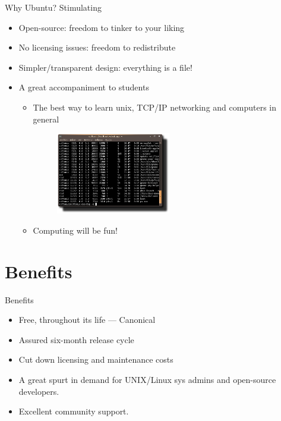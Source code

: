 \documentclass{beamer}
\begin{document}
 \begin{frame}{Why Ubuntu?}
  Stimulating
  \begin{itemize}
   \pause
   \item Open-source: freedom to tinker to your liking
   \pause
   \item No licensing issues: freedom to redistribute
   \pause
   \item Simpler/transparent design: everything is a file!
  \end{itemize}
 \end{frame}

 \begin{frame}
  \begin{itemize}
   \item A great accompaniment to students
   \pause
    \begin{itemize}
     \item The best way to learn unix, TCP/IP networking and computers in general
     \begin{figure}
      \includegraphics[width=5cm]{Images/linux_terminal}
     \end{figure}
     \pause
     \item Computing will be fun!
    \end{itemize}
  \end{itemize}
 \end{frame}

 \section{Benefits}
 \begin{frame}{Benefits}
  \begin{itemize}
   \pause
   \item Free, throughout its life --- Canonical
   \pause
   \item Assured six-month release cycle
   \pause
   \item Cut down licensing and maintenance costs
   \pause
   \item A great spurt in demand for UNIX/Linux sys admins and open-source developers.
   \pause
   \item Excellent community support.
  \end{itemize}
 \end{frame}
\end{document}
